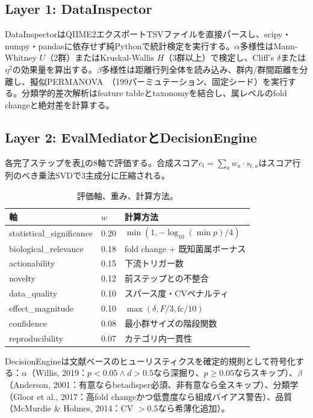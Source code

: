 \documentclass[11pt,a4paper]{article}
\begin{document}
\subsection{Layer 1: DataInspector}

DataInspectorはQIIME2エクスポートTSVファイルを直接パースし、scipy・numpy・pandasに依存せず純Pythonで統計検定を実行する。$\alpha$多様性はMann-Whitney $U$（2群）またはKruskal-Wallis $H$（3群以上）で検定し、Cliff's $\delta$または$\eta^2$の効果量を算出する。$\beta$多様性は距離行列全体を読み込み、群内/群間距離を分離し、擬似PERMANOVA~\citep{anderson2001}（199パーミュテーション、固定シード）を実行する。分類学的差次解析はfeature tableとtaxonomyを結合し、属レベルのfold changeと絶対差を計算する。

\subsection{Layer 2: EvalMediatorとDecisionEngine}

各完了ステップを表\ref{tab:axes}の8軸で評価する。合成スコア$c_t = \sum_a w_a \cdot s_{t,a}$はスコア行列のべき乗法SVDで3主成分に圧縮される。

\begin{table}[t]
\centering
\caption{評価軸、重み、計算方法。}
\label{tab:axes}
\small
\begin{tabular}{@{}llp{7cm}@{}}
\toprule
\textbf{軸} & \textbf{$w$} & \textbf{計算方法} \\
\midrule
statistical\_significance & 0.20 & $\min(1, -\log_{10}(\min p) / 4)$ \\
biological\_relevance & 0.18 & fold change + 既知菌属ボーナス \\
actionability & 0.15 & 下流トリガー数 \\
novelty & 0.12 & 前ステップとの不整合 \\
data\_quality & 0.10 & スパース度・CVペナルティ \\
effect\_magnitude & 0.10 & $\max(\delta, F/3, \mathrm{fc}/10)$ \\
confidence & 0.08 & 最小群サイズの階段関数 \\
reproducibility & 0.07 & カテゴリ内一貫性 \\
\bottomrule
\end{tabular}
\end{table}

DecisionEngineは文献ベースのヒューリスティクスを確定的規則として符号化する：$\alpha$（Willis, 2019：$p < 0.05 \land d > 0.5$なら深掘り、$p \geq 0.05$ならスキップ）、$\beta$（Anderson, 2001：有意ならbetadisper必須、非有意なら全スキップ）、分類学（Gloor et al., 2017：高fold changeかつ低豊度なら組成バイアス警告）、品質（McMurdie \& Holmes, 2014：CV $> 0.5$なら希薄化追加）。
\end{document}
